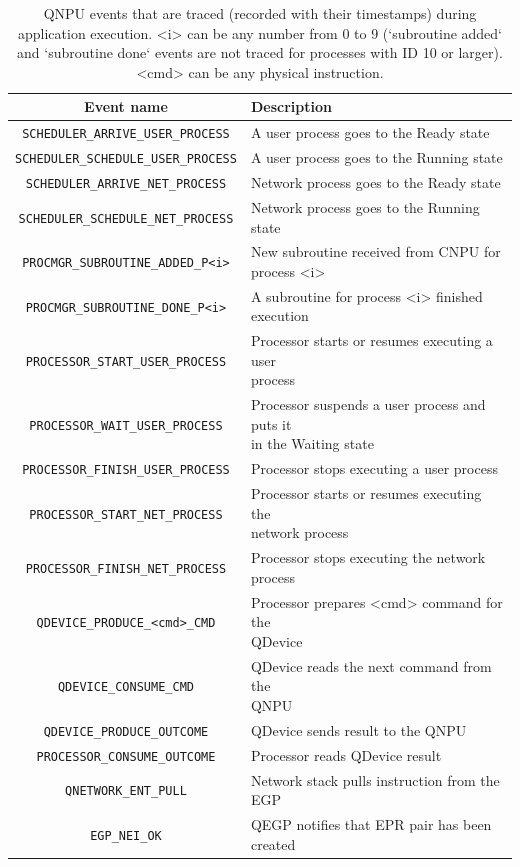 \begin{table}
    \centering
    \begin{tabular}{|c|l|}
    \hline
    \textbf{Event name} & \textbf{Description} \\ 
    \hline
    \texttt{SCHEDULER\_ARRIVE\_USER\_PROCESS} & A user process goes to the Ready state \\
    \texttt{SCHEDULER\_SCHEDULE\_USER\_PROCESS} & A user process goes to the Running state \\
    \texttt{SCHEDULER\_ARRIVE\_NET\_PROCESS} & Network process goes to the Ready state \\
    \texttt{SCHEDULER\_SCHEDULE\_NET\_PROCESS} & Network process goes to the Running state \\
    \texttt{PROCMGR\_SUBROUTINE\_ADDED\_P<i>} & \makecell[l]{New subroutine received from \ac{CNPU} for \\ process <i>} \\
    \texttt{PROCMGR\_SUBROUTINE\_DONE\_P<i>} & A subroutine for process <i> finished execution \\
    \texttt{PROCESSOR\_START\_USER\_PROCESS} & \makecell[l]{Processor starts or resumes executing a user \\ process} \\
    \texttt{PROCESSOR\_WAIT\_USER\_PROCESS} & \makecell[l]{Processor suspends a user process and puts it \\ in the Waiting state} \\
    \texttt{PROCESSOR\_FINISH\_USER\_PROCESS} & Processor stops executing a user process \\
    \texttt{PROCESSOR\_START\_NET\_PROCESS} & \makecell[l]{Processor starts or resumes executing the \\ network process} \\
    \texttt{PROCESSOR\_FINISH\_NET\_PROCESS} & Processor stops executing the network process \\
    \texttt{QDEVICE\_PRODUCE\_<cmd>\_CMD} & \makecell[l]{Processor prepares <cmd> command for the \\ \ac{QDevice}} \\
    \texttt{QDEVICE\_CONSUME\_CMD} & \makecell[l]{\ac{QDevice} reads the next command from the \\ \ac{QNPU}} \\
    \texttt{QDEVICE\_PRODUCE\_OUTCOME} & \ac{QDevice} sends result to the \ac{QNPU} \\
    \texttt{PROCESSOR\_CONSUME\_OUTCOME} & Processor reads \ac{QDevice} result \\
    \texttt{QNETWORK\_ENT\_PULL} & Network stack pulls instruction from the EGP \\
    \texttt{EGP\_NEI\_OK} & QEGP notifies that EPR pair has been created \\
    \hline
    \end{tabular}
    \caption{\ac{QNPU} events that are traced (recorded with their timestamps) during application execution. <i> can be any number from 0 to 9 (`subroutine added` and `subroutine done` events are not traced for processes with ID 10 or larger). <cmd> can be any physical instruction.}
    \label{tab:qnpu_events}
\end{table}

